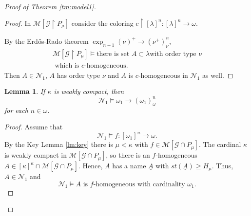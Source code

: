 \documentclass[a4paper,10pt,reqno]{amsart}
\numberwithin{equation}{section}
\newtheorem{lemma}[theorem]{Lemma}
\theoremstyle{definition}
\theoremstyle{remark}
\newcommand{\mc}[1]{\mathcal{#1}}
\newcommand{\subs}{\subset}
\begin{document}
\begin{proof}[Proof of Theorem \ref{tm:model1}]
\begin{proof}
In $\mc M[\mc G\restriction P_{\mu}]$ consider the coloring 
$c\restriction {[{\lambda}]}^{n}:{[{\lambda}]}^{n}\to {\omega}$.

By the Erdős-Rado theorem $\exp_{n-1}({\nu})^+\to ({\nu}^+)^n_{\nu}$, 
\begin{multline*}
    \mc M[\mc G\restriction P_{\mu}]\models\text{there is set $A\subs {\lambda}$
    with order type ${\nu}$}\\\text{ 
    which is $c$-homogeneous. 
    } 
\end{multline*}
Then $A \in \mc N_1$, $A$ has order type ${\nu}$ and $A$ is $c$-homogeneous in 
$\mc N_1$ as well. 
\end{proof}

    
    



\begin{lemma}\label{lm:wc}
    If ${\kappa}$ is weakly compact, then 
    \begin{displaymath}
    \mc N_1\models {\omega}_1\to ({\omega}_1)^n_{\omega}
    \end{displaymath}
    for each $n\in {\omega}$.
    \end{lemma}
        
    \begin{proof}
    Assume that 
    \begin{displaymath}
    \mc N_1\models f:{[{\omega}_1]}^{n}\to {\omega}.
    \end{displaymath}
    By the Key Lemma \ref{lm:key} there is ${\mu}<{\kappa}$ with 
    $f\in \mc M[\mc G\cap P_{\mu}]$. The cardinal ${\kappa}$ is weakly compact in $\mc M[\mc G\cap P_{\mu}]$,
    so there is an $f$-homogeneous $A\in {[{\kappa}]}^{{\kappa}}\cap \mc M[\mc G\cap P_{\mu}]$.
    Hence, $A$ has a name $\underline A$ with $st(\underline A)\ge H_{\mu}$.
    Thus,  $A\in \mc N_1$ and 
    \begin{displaymath}
    \mc N_1\models \text{$A$ is $f$-homogeneous with cardinality ${\omega}_1$.}
    \end{displaymath}
    \end{proof}
    
    
            




\end{proof}
\end{document}

